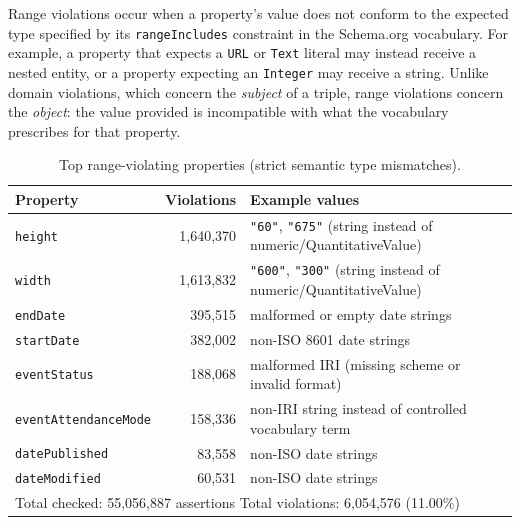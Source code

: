 \documentclass[11pt,a4paper]{article}
\begin{document}
Range violations occur when a property's value does not conform to the
expected type specified by its \texttt{rangeIncludes} constraint in the
Schema.org vocabulary.
For example, a property that expects a \texttt{URL} or \texttt{Text} literal
may instead receive a nested entity, or a property expecting an
\texttt{Integer} may receive a string.
Unlike domain violations, which concern the \emph{subject} of a triple, range
violations concern the \emph{object}: the value provided is incompatible with
what the vocabulary prescribes for that property.

\begin{table}[H]
\centering
\caption{Top range-violating properties (strict semantic type mismatches).}
\label{tab:range}
\begin{tabular}{lrl}
\toprule
\textbf{Property} & \textbf{Violations} & \textbf{Example values} \\
\midrule
\texttt{height}                & 1{,}640{,}370 & \texttt{"60"}, \texttt{"675"} (string instead of numeric/QuantitativeValue) \\
\texttt{width}                 & 1{,}613{,}832 & \texttt{"600"}, \texttt{"300"} (string instead of numeric/QuantitativeValue) \\
\texttt{endDate}               &   395{,}515   & malformed or empty date strings \\
\texttt{startDate}             &   382{,}002   & non-ISO 8601 date strings \\
\texttt{eventStatus}           &   188{,}068   & malformed IRI (missing scheme or invalid format) \\
\texttt{eventAttendanceMode}   &   158{,}336   & non-IRI string instead of controlled vocabulary term \\
\texttt{datePublished}         &    83{,}558   & non-ISO date strings \\
\texttt{dateModified}          &    60{,}531   & non-ISO date strings \\
\midrule
\multicolumn{3}{l}{\small Total checked: 55{,}056{,}887 assertions \quad Total violations: 6{,}054{,}576 (11.00\%)} \\
\bottomrule
\end{tabular}
\end{table}
\end{document}
